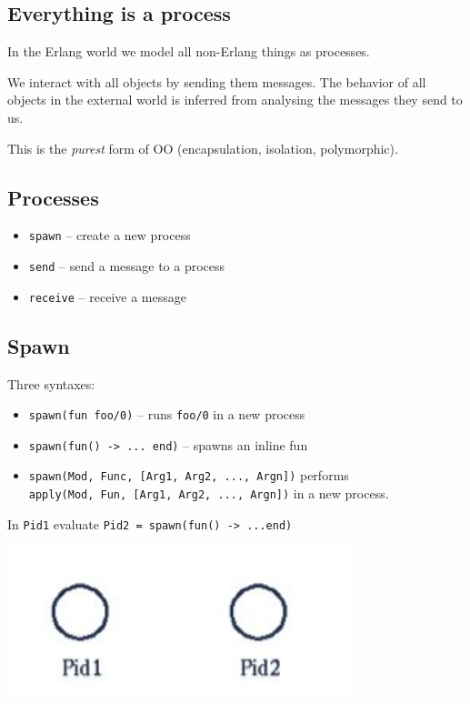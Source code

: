 \documentclass[12pt]{article}
\begin{document}
\subsection{Everything is a process}

In the Erlang world we model all non-Erlang things as processes.

We interact with all objects by sending them messages. The behavior
of all objects in the external world is inferred from analysing the
messages they send to us. 

This is the {\sl purest} form of OO (encapsulation, isolation, polymorphic).

\subsection{Processes}

\begin{itemize}
\item \verb+spawn+ -- create a new process
\item \verb+send+ -- send a message to a process
\item \verb+receive+ -- receive a message
\end{itemize}

\subsection{Spawn}

Three syntaxes:
\begin{itemize}
\item \verb+spawn(fun foo/0)+ -- runs \verb+foo/0+ in a new process
\item \verb+spawn(fun() -> ... end)+ -- spawns an inline fun 
\item \verb+spawn(Mod, Func, [Arg1, Arg2, ..., Argn])+ performs\\
\verb+apply(Mod, Fun, [Arg1, Arg2, ..., Argn])+ in
a new process.
\end{itemize}

In \verb+Pid1+ evaluate \verb+Pid2 = spawn(fun() -> ...end)+

\includegraphics[width=10cm]{images/proc2.jpg}
\end{document}
